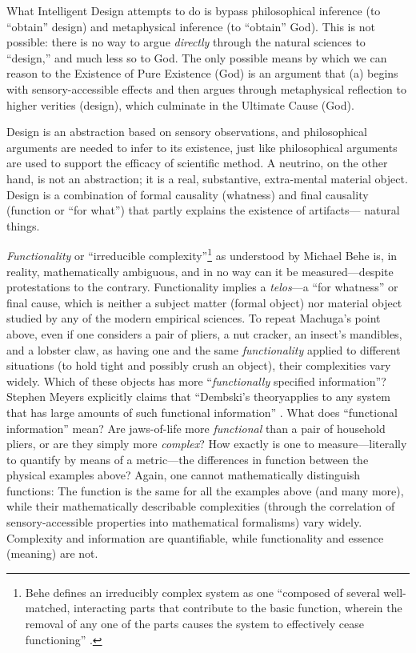 What Intelligent Design attempts to do is bypass philosophical inference (to ``obtain'' design) and metaphysical inference (to ``obtain'' God). This is not possible: there is no way to argue \textit{directly} through the natural sciences to ``design,'' and much less so to God. The only possible means by which we can reason to the Existence of Pure Existence (God) is an argument that (a) begins with sensory-accessible effects and then argues through metaphysical reflection to higher verities (design), which culminate in the Ultimate Cause (God).

Design is an abstraction based on sensory observations, and philosophical arguments are needed to infer to its existence, just like philosophical arguments are used to support the efficacy of scientific method. A neutrino, on the other hand, is not an abstraction; it is a real, substantive, extra-mental material object. Design is a combination of formal causality (whatness) and final causality (function or ``for what'') that partly explains the existence of artifacts--- natural things.

\textit{Functionality} or ``irreducible complexity''\footnote{Behe defines an irreducibly complex system as one “composed of several well-matched, interacting parts that contribute to the basic function, wherein the removal of any one of the parts causes the system to effectively cease functioning” \citep[][p.~39]{behe2006}.} as understood by Michael Behe is, in reality, mathematically ambiguous, and in no way can it be measured---despite protestations to the contrary. Functionality implies a \textit{telos}---a “for whatness” or final cause, which is neither a subject matter (formal object) nor material object studied by any of the modern empirical sciences.  To repeat Machuga's point above, even if one considers a pair of pliers, a nut cracker, an insect's mandibles, and a lobster claw, as having one and the same \textit{functionality} applied to different situations (to hold tight and possibly crush an object), their complexities vary widely. Which of these objects has more ``\textit{functionally} specified information''? Stephen Meyers explicitly claims that ``Dembski's theory{\jdots}applies to any system that has large amounts of such functional information'' \cite[p.~372]{sigcell}. What does  ``functional information'' mean? Are jaws-of-life more \textit{functional} than a pair of household pliers, or are they simply more \textit{complex}?  How exactly is one to measure---literally to quantify by means of a metric---the differences in function between the physical examples above? Again, one cannot mathematically distinguish functions: The function is the same for all the examples above (and many more), while their mathematically describable complexities (through the correlation of sensory-accessible properties into mathematical formalisms) vary widely.  Complexity and information are quantifiable, while functionality and essence (meaning) are not.

